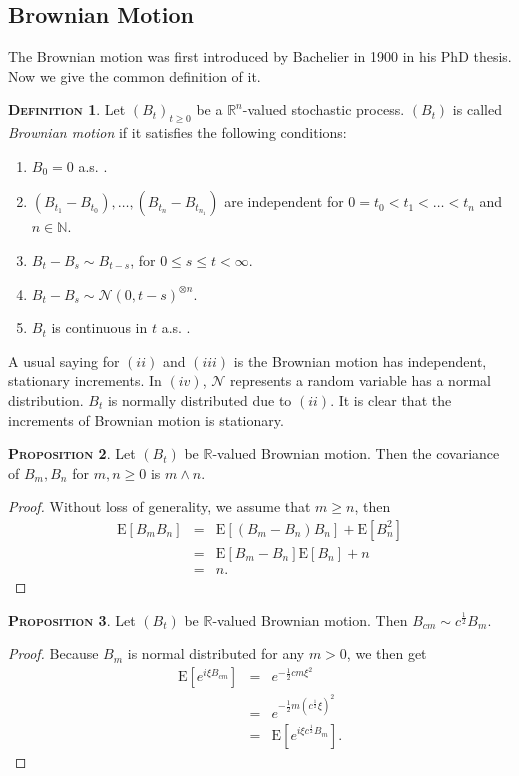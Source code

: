 \documentclass[a4paper, twoside, 11pt]{article}
\theoremstyle{definition}
\newtheorem{definition}{\scshape Definition}[section]
\newtheorem{proposition}[definition]{\scshape Proposition}
\begin{document}
  \subsection{Brownian Motion}
  The Brownian motion was first introduced by Bachelier in 1900 in his PhD thesis. Now we give the common definition of it.
  \begin{definition}
  Let $(B_t)_{t\ge0}$ be a $\mathbb{R}^{n}$-valued stochastic process. $(B_t)$ is called \emph{Brownian motion} if it satisfies the following conditions:
  \begin{enumerate}[topsep=0pt, itemsep=-1ex, partopsep=1ex, parsep=1ex, label=(\roman*)]
	\item $B_0 = 0 $ a.s. .
	\item $(B_{t_1} - B_{t_0}),\dots,(B_{t_n} - B_{t_{n_1}})$ are independent for $0=t_0<t_1<\dots<t_n$ and $n \in \mathbb{N}$.
	\item $B_t - B_s \sim B_{t-s}$, for $0 \le s \le t < \infty$.
	\item $B_t - B_s \sim \mathcal{N}(0, t-s)^{\otimes n}$.
	\item $B_t$ is continuous in $t$ a.s. .
  \end{enumerate}
  \end{definition}
  A usual saying for $(ii)$ and $(iii)$ is the Brownian motion has independent, stationary increments. In $(iv)$, $\mathcal{N}$ represents a random variable has a normal distribution. $B_t$ is normally distributed due to $(ii)$. It is clear that the increments of Brownian motion is stationary.

  \begin{proposition}
	Let $(B_t)$ be $\mathbb{R}$-valued Brownian motion. Then the covariance of $B_m, B_n$ for $m, n \ge 0$ is $m \wedge n $.
  \end{proposition}
  \begin{proof}
	Without loss of generality, we assume that $m \ge n$, then
	\begin{eqnarray*}
	  \mathrm{E}[B_mB_n] &=& \mathrm{E}[(B_m - B_n)B_n] + \mathrm{E}[B_n^2]\\
	  &=& \mathrm{E}[B_m - B_n]\mathrm{E}[B_n] + n\\
	  &=& n .
	\end{eqnarray*}
	\label{sec:cor}
  \end{proof}

  \begin{proposition}
	Let $(B_t)$ be  $\mathbb{R}$-valued Brownian motion. Then $B_{cm} \sim c^{\frac{1}{2}}B_m$.
  \end{proposition}
  \begin{proof}
	Because $B_m$ is normal distributed for any $m > 0$, we then get
	\begin{eqnarray*}
	  \mathrm{E} [e^{i\xi B_{cm}}] &=& e^{-\frac{1}{2}cm\xi^2}\\
	  &=& e^{-\frac{1}{2}m(c^{\frac{1}{2}}\xi)^2}\\
	  &=& \mathrm{E} [e^{i\xi c^{\frac{1}{2}}B_m}] .
	\end{eqnarray*}
  \end{proof}
\end{document}
